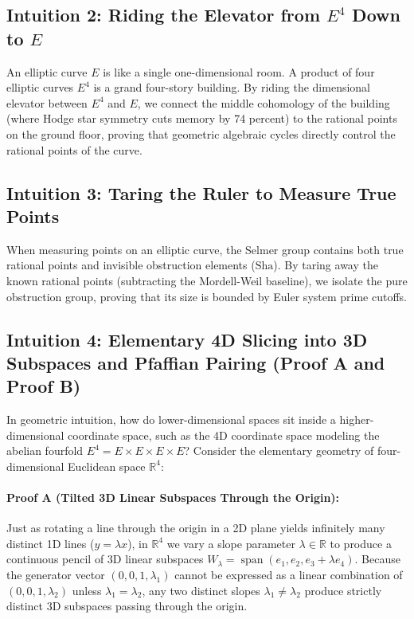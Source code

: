 \documentclass[11pt,a4paper]{article}
\theoremstyle{definition}
\def\Sha{\mathrm{Sha}}
\begin{document}
\subsection{Intuition 2: Riding the Elevator from $E^4$ Down to $E$}
An elliptic curve $E$ is like a single one-dimensional room. A product of four elliptic curves $E^4$ is a grand four-story building. By riding the dimensional elevator between $E^4$ and $E$, we connect the middle cohomology of the building (where Hodge star symmetry cuts memory by 74 percent) to the rational points on the ground floor, proving that geometric algebraic cycles directly control the rational points of the curve.

\subsection{Intuition 3: Taring the Ruler to Measure True Points}
When measuring points on an elliptic curve, the Selmer group contains both true rational points and invisible obstruction elements ($\Sha$). By taring away the known rational points (subtracting the Mordell-Weil baseline), we isolate the pure obstruction group, proving that its size is bounded by Euler system prime cutoffs.

\subsection{Intuition 4: Elementary 4D Slicing into 3D Subspaces and Pfaffian Pairing (Proof A and Proof B)}
In geometric intuition, how do lower-dimensional spaces sit inside a higher-dimensional coordinate space, such as the 4D coordinate space modeling the abelian fourfold $E^4 = E \times E \times E \times E$?
Consider the elementary geometry of four-dimensional Euclidean space $\mathbb{R}^4$:

\paragraph{Proof A (Tilted 3D Linear Subspaces Through the Origin):}
Just as rotating a line through the origin in a 2D plane yields infinitely many distinct 1D lines ($y = \lambda x$), in $\mathbb{R}^4$ we vary a slope parameter $\lambda \in \mathbb{R}$ to produce a continuous pencil of 3D linear subspaces $W_\lambda = \operatorname{span}(e_1, e_2, e_3 + \lambda e_4)$. Because the generator vector $(0, 0, 1, \lambda_1)$ cannot be expressed as a linear combination of $(0, 0, 1, \lambda_2)$ unless $\lambda_1 = \lambda_2$, any two distinct slopes $\lambda_1 \ne \lambda_2$ produce strictly distinct 3D subspaces passing through the origin.
\end{document}
